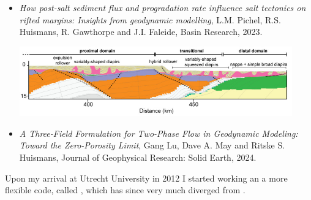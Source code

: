 \begin{itemize}
\item {\it How post-­salt sediment flux and progradation rate
influence salt tectonics on rifted margins: Insights from
geodynamic modelling},
L.M. Pichel, R.S. Huismans, R. Gawthorpe and  J.I. Faleide, Basin Research, 2023. \cite{pihg23}
\begin{center}
\includegraphics[height=3cm]{images/mycodes/pihg23_img}
\end{center}

\item {\it A Three-Field Formulation for Two-Phase Flow in
Geodynamic Modeling: Toward the Zero-Porosity Limit},
Gang Lu, Dave A. May and Ritske S. Huismans, 
Journal of Geophysical Research: Solid Earth, 2024. \cite{lumh24}


\end{itemize}



Upon my arrival at Utrecht University in 2012 I started working an a more flexible code, called \elefant, 
which has since very much diverged from \fantom.


